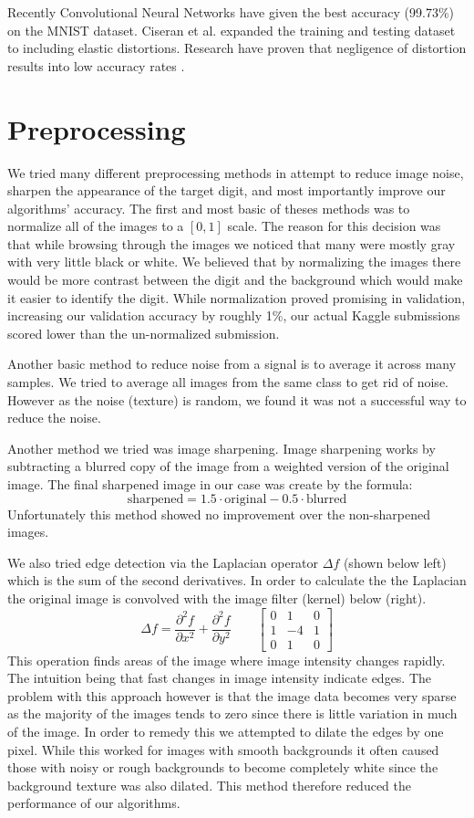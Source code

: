 \documentclass[10pt,twocolumn]{article}
\begin{document}
Recently Convolutional Neural Networks have given the best accuracy (99.73\%) on the MNIST dataset. Ciseran et al. expanded the training and testing dataset to including elastic distortions. Research have proven that negligence of distortion results into low accuracy rates \cite {gil2014handwritten}.
\section{Preprocessing}
We tried many different preprocessing methods in attempt to reduce image noise, sharpen the appearance of the target digit, and most importantly improve our algorithms' accuracy. The first and most basic of theses methods was to normalize all of the images to a $[0,1]$ scale. The reason for this decision was that while browsing through the images we noticed that many were mostly gray with very little black or white. We believed that by normalizing the images there would be more contrast between the digit and the background which would make it easier to identify the digit. While normalization proved promising in validation, increasing our validation accuracy by roughly 1\%, our actual Kaggle submissions scored lower than the un-normalized submission.

Another basic method to reduce noise from a signal is to average it across many samples.  We tried to average all images from the same class to get rid of noise. However as the noise (texture) is random, we found it was not a successful way to reduce the noise.

Another method we tried was image sharpening. Image sharpening works by subtracting a blurred copy of the image from a weighted version of the original image. The final sharpened image in our case was create by the formula: \[\text{sharpened} = 1.5 \cdot \text{original} - 0.5 \cdot \text{blurred}\]
Unfortunately this method showed no improvement over the non-sharpened images.

We also tried edge detection via the Laplacian operator $\Delta f$ (shown below left) which is the sum of the second derivatives. In order to calculate the the Laplacian the original image is convolved with the image filter (kernel)  below (right).
\[\Delta f = \frac{\partial^2 f}{\partial x^2} + \frac{\partial^2 f}{\partial y^2}
\qquad
\begin{bmatrix}
0 & 1 & 0 \\
1 & -4 & 1 \\
0 & 1 & 0
\end{bmatrix}
\]
This operation finds areas of the image where image intensity changes rapidly. The intuition being that fast changes in image intensity indicate edges. The problem with this approach however is that the image data becomes very sparse as the majority of the images tends to zero since there is little variation in much of the image. In order to remedy this we attempted to dilate the edges by one pixel. While this worked for images with smooth backgrounds it often caused those with noisy or rough backgrounds to become completely white since the background texture was also dilated. This method therefore reduced the performance of our algorithms.
\end{document}
